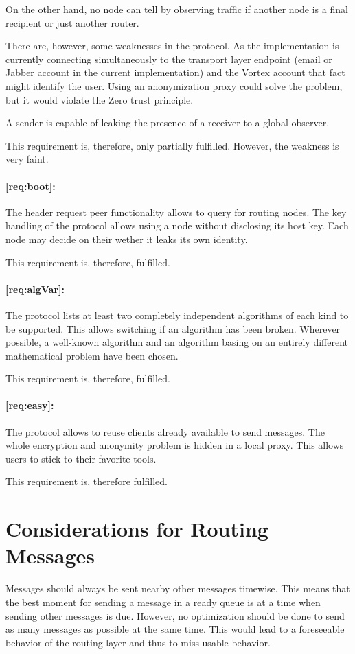 On the other hand, no node can tell by observing traffic if another node is a final recipient or just another router.

There are, however, some weaknesses in the protocol. As the implementation is currently connecting simultaneously to the transport layer endpoint (email or Jabber account in the current implementation) and the Vortex account that fact might identify the user. Using an anonymization proxy could solve the problem, but it would violate the Zero trust principle.

A sender is capable of leaking the presence of a receiver to a global observer.

This requirement is, therefore, only partially fulfilled. However, the weakness is very faint.

\paragraph*{\ref{req:boot}:} The header request peer functionality allows to query for routing nodes. The key handling of the protocol allows using a node without disclosing its host key. Each node may decide on their wether it leaks its own identity.

This requirement is, therefore, fulfilled.

\paragraph*{\ref{req:algVar}:} The protocol lists at least two completely independent algorithms of each kind to be supported. This allows switching if an algorithm has been broken. Wherever possible, a well-known algorithm and an algorithm basing on an entirely different mathematical problem have been chosen.

This requirement is, therefore, fulfilled.

\paragraph*{\ref{req:easy}:} The protocol allows to reuse clients already available to send messages. The whole encryption and anonymity problem is hidden in a local proxy. This allows users to stick to their favorite tools.

This requirement is, therefore fulfilled.

\section{Considerations for Routing Messages}
Messages should always be sent nearby other messages timewise. This means that the best moment for sending a message in a ready queue is at a time when sending other messages is due. However, no optimization should be done to send as many messages as possible at the same time. This would lead to a foreseeable behavior of the routing layer and thus to miss-usable behavior.


